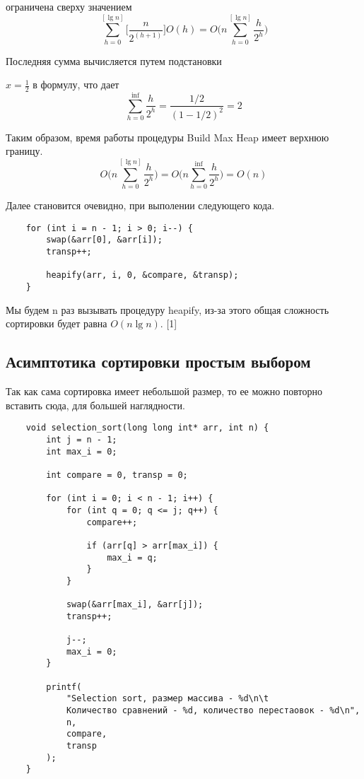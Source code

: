 \documentclass[a4paper,12pt,titlepage,finall]{article}
\begin{document}
ограничена сверху значением
\[ 
{\sum_{h=0}^{[\lg n]} \biggl[\frac{n}{2^(h + 1)} \biggr]}O(h) = O\biggl(n\sum_{h=0}^{[\lg n]} \frac{h}{2^h} \biggr)
\]

Последняя сумма вычисляется путем подстановки {$x = \frac{1}{2}$ в формулу, что дает
\[
\sum_{h=0}^{\inf} \frac{h}{2^h} = \frac{ 1/2 }{ (1 - 1/2)^2 } = 2
\]

Таким образом, время работы процедуры Build Max Heap имеет верхнюю границу. 
\[
O\biggl(n\sum_{h=0}^{[\lg n]} \frac{h}{2^h} \biggr) = O\biggl(n\sum_{h = 0}^{\inf} \frac{h}{2^h}  \biggr) = O(n)
\]

Далее становится очевидно, при выполении следующего кода.
\begin{verbatim}
    for (int i = n - 1; i > 0; i--) {
        swap(&arr[0], &arr[i]);
        transp++;

        heapify(arr, i, 0, &compare, &transp);
    }
\end{verbatim}
Мы будем n раз вызывать процедуру heapify, из-за этого
общая сложность сортировки будет равна $O(n\lg n)$. [1]


\newpage

\subsection{Асимптотика сортировки простым выбором}

Так как сама сортировка имеет небольшой размер, то ее можно повторно
вставить сюда, для большей наглядности.
\begin{verbatim}
    void selection_sort(long long int* arr, int n) {
        int j = n - 1;
        int max_i = 0;
    
        int compare = 0, transp = 0;
    
        for (int i = 0; i < n - 1; i++) {
            for (int q = 0; q <= j; q++) {
                compare++;
    
                if (arr[q] > arr[max_i]) {
                    max_i = q;  
                }
            }
    
            swap(&arr[max_i], &arr[j]);
            transp++;
    
            j--;
            max_i = 0;
        }
    
        printf(
            "Selection sort, размер массива - %d\n\t
            Количество сравнений - %d, количество перестаовок - %d\n",
            n,
            compare,
            transp
        );
    }
\end{verbatim}

}
\end{document}
